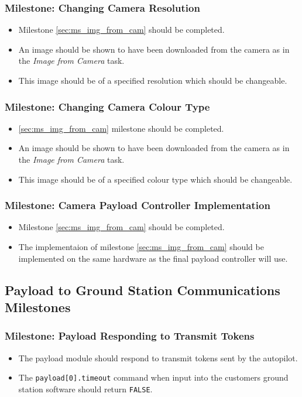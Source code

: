	\subsubsection{Milestone: Changing Camera Resolution}
		\label{sec:ms_img_cam_change_res}
		\begin{itemize}
			\item 	Milestone \ref{sec:ms_img_from_cam} should be completed.
			\item 	An image should be shown to have been downloaded 
				from the camera as in the \emph{Image from Camera}
				task.
			\item 	This image should be of a specified resolution which
				should be changeable.
		\end{itemize}

	\subsubsection{Milestone: Changing Camera Colour Type}
		\label{sec:ms_img_cam_change_colour_type}
		\begin{itemize}
			\item 	\ref{sec:ms_img_from_cam} milestone should be completed.
			\item 	An image should be shown to have been downloaded 
				from the camera as in the \emph{Image from Camera}
				task.
			\item 	This image should be of a specified colour type which
				should be changeable.
		\end{itemize}

	\subsubsection{Milestone: Camera Payload Controller Implementation}
		\label{sec:ms_img_cam_controller_implementation}
		\begin{itemize}
			\item 	Milestone \ref{sec:ms_img_from_cam} should be completed.
			\item 	The implementaion of milestone \ref{sec:ms_img_from_cam} 
				should be implemented on the same hardware as the final
				payload controller will use.
		\end{itemize}

\subsection{Payload to Ground Station Communications Milestones}
	\subsubsection{Milestone: Payload Responding to Transmit Tokens}
		\label{sec:ms_pl_tx_token_resp}
		\begin{itemize}
			\item 	The payload module should respond to transmit tokens
				sent by the autopilot. 
			\item 	The \verb+payload[0].timeout+ command when input into
				the customers ground station software should return 
				\verb+FALSE+.
		\end{itemize}

